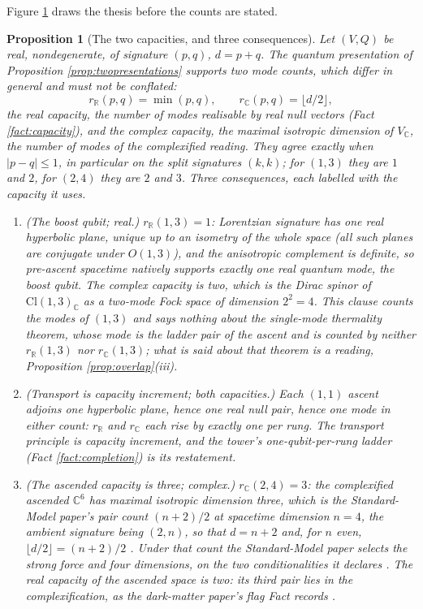 \documentclass[11pt]{article}
\newtheorem{proposition}[theorem]{Proposition}
\theoremstyle{definition}
\newcommand{\Cl}{\mathrm{Cl}}
\newcommand{\R}{\mathbb{R}}
\newcommand{\C}{\mathbb{C}}
\begin{document}
\begin{figure}[ht]
\label{fig:twocharts}
\end{figure}

Figure \ref{fig:twocharts} draws the thesis before the counts are stated.

\begin{proposition}[The two capacities, and three consequences]\label{prop:capacity}
Let $(V,Q)$ be real, nondegenerate, of signature $(p,q)$, $d = p+q$. The quantum presentation of Proposition \ref{prop:twopresentations} supports two mode counts, which differ in general and must not be conflated:
\[
r_{\R}(p,q) = \min(p,q), \qquad r_{\C}(p,q) = \lfloor d/2 \rfloor,
\]
the \emph{real capacity}, the number of modes realisable by real null vectors (Fact \ref{fact:capacity}), and the \emph{complex capacity}, the maximal isotropic dimension of $V_{\C}$, the number of modes of the complexified reading. They agree exactly when $|p - q| \leq 1$, in particular on the split signatures $(k,k)$; for $(1,3)$ they are $1$ and $2$, for $(2,4)$ they are $2$ and $3$. Three consequences, each labelled with the capacity it uses.
\begin{enumerate}
\item \emph{(The boost qubit; real.)} $r_{\R}(1,3) = 1$: Lorentzian signature has one real hyperbolic plane, unique up to an isometry of the whole space (all such planes are conjugate under $O(1,3)$), and the anisotropic complement is definite, so pre-ascent spacetime natively supports exactly one \emph{real} quantum mode, the boost qubit. The complex capacity is two, which is the Dirac spinor of $\Cl(1,3)_{\C}$ as a two-mode Fock space of dimension $2^{2} = 4$. This clause counts the modes of $(1,3)$ and says nothing about the single-mode thermality theorem, whose mode is the ladder pair of the ascent and is counted by neither $r_{\R}(1,3)$ nor $r_{\C}(1,3)$; what is said about that theorem is a reading, Proposition \ref{prop:overlap}(iii).
\item \emph{(Transport is capacity increment; both capacities.)} Each $(1,1)$ ascent adjoins one hyperbolic plane, hence one real null pair, hence one mode in either count: $r_{\R}$ and $r_{\C}$ each rise by exactly one per rung. The transport principle is capacity increment, and the tower's one-qubit-per-rung ladder (Fact \ref{fact:completion}) is its restatement.
\item \emph{(The ascended capacity is three; complex.)} $r_{\C}(2,4) = 3$: the complexified ascended $\C^{6}$ has maximal isotropic dimension three, which is the Standard-Model paper's pair count $(n+2)/2$ at spacetime dimension $n = 4$, the ambient signature being $(2,n)$, so that $d = n + 2$ and, for $n$ even, $\lfloor d/2 \rfloor = (n+2)/2$ \cite[Lem.~2.12]{ButlerT12}. Under that count the Standard-Model paper selects the strong force and four dimensions, on the two conditionalities it declares \cite[Prop.~4.3]{ButlerT12}. The real capacity of the ascended space is two: its third pair lies in the complexification, as the dark-matter paper's flag Fact records \cite[Fact~2.9]{ButlerT14}.

\end{enumerate}
\end{proposition}
\end{document}
